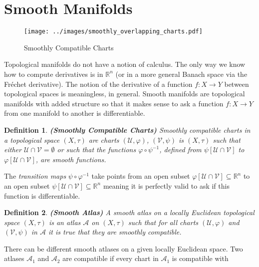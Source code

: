 \documentclass{article}
\theoremstyle{plain}
\theoremstyle{normal}
\newtheorem{definition}{Definition}[section]
\begin{document}
    \section{Smooth Manifolds}
        \begin{figure}
            \centering
            \texttt{[image: ../images/smoothly\_overlapping\_charts.pdf]}
            \caption{Smoothly Compatible Charts}
            \label{fig:smoothly_overlapping_charts}
        \end{figure}
        Topological manifolds do not have a notion of calculus. The only way
        we know how to compute derivatives is in $\mathbb{R}^{n}$
        (or in a more general Banach space via the Fr\'{e}chet derivative).
        The notion of the derivative of a function
        $f:X\rightarrow{Y}$ between topological spaces is meaningless, in
        general. Smooth manifolds are topological manifolds with added structure
        so that it makes sense to ask a function
        $f:X\rightarrow{Y}$ from one manifold to another is differentiable.
        \begin{definition}{\textbf{(Smoothly Compatible Charts)}}
            Smoothly compatible charts in a topological space
            $(X,\tau)$ are charts $(\mathcal{U},\varphi)$,
            $(\mathcal{V},\psi)$ is $(X,\tau)$ such that either
            $\mathcal{U}\cap\mathcal{V}=\emptyset$ or such that the functions
            $\varphi\circ\psi^{-1}$, defined from
            $\psi[\mathcal{U}\cap\mathcal{V}]$ to
            $\varphi[\mathcal{U}\cap\mathcal{V}]$, are smooth functions.
        \end{definition}
        The \textit{transition maps} $\psi\circ\varphi^{-1}$ take points from
        an open subset
        $\varphi[\mathcal{U}\cap\mathcal{V}]\subseteq\mathbb{R}^{n}$ to an
        open subset $\psi[\mathcal{U}\cap\mathcal{V}]\subseteq\mathbb{R}^{n}$
        meaning it is perfectly valid to ask if this function is differentiable.
        \begin{definition}{\textbf{(Smooth Atlas)}}
            A smooth atlas on a locally Euclidean topological space
            $(X,\tau)$ is an atlas $\mathcal{A}$ on $(X,\tau)$ such that for
            all charts $(\mathcal{U},\varphi)$ and $(\mathcal{V},\psi)$ in
            $\mathcal{A}$ it is true that they are smoothly compatible.
        \end{definition}
        There can be different smooth atlases on a given locally Euclidean
        space. Two atlases $\mathcal{A}_{1}$ and $\mathcal{A}_{2}$ are
        compatible if every chart in $\mathcal{A}_{1}$ is compatible with
\end{document}
